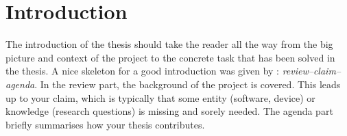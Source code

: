 \chapter{Introduction}
The introduction of the thesis should take the reader all the way from the big picture and context of the project to the concrete task that has been solved in the thesis. A nice skeleton for a good introduction was given by \textcite{claerbout1991scrutiny}: \emph{review–claim–agenda}. In the review part, the background of the project is covered. This leads up to your claim, which is typically that some entity (software, device) or knowledge (research questions) is missing and sorely needed. The agenda part briefly summarises how your thesis contributes.
